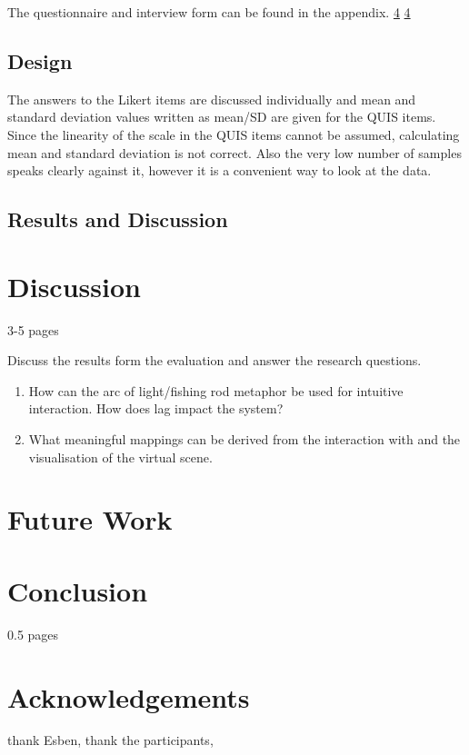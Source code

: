 \documentclass[10pt,a4paper]{scrartcl}
\begin{document}
The questionnaire and interview form can be found in the appendix. \ref{} \ref{}


\subsection{Design}
The answers to the Likert items are discussed individually and mean and standard deviation values written as mean/SD are given for the QUIS items. Since the linearity of the scale in the QUIS items cannot be assumed, calculating mean and standard deviation is not correct. Also the very low number of samples speaks clearly against it, however it is a convenient way to look at the data.



\subsection{Results and Discussion}

















\section{Discussion}
\label{sec:discussion}
3-5 pages

Discuss the results form the evaluation and answer the research questions. 

\begin{enumerate}
\item How can the arc of light/fishing rod metaphor be used for intuitive interaction. How does lag impact the system?
\item What meaningful mappings can be derived from the interaction with and the visualisation of the virtual scene.
\end{enumerate}

\section{Future Work}

\section{Conclusion}
0.5 pages

\section{Acknowledgements}
thank Esben, thank the participants,






\end{document}
